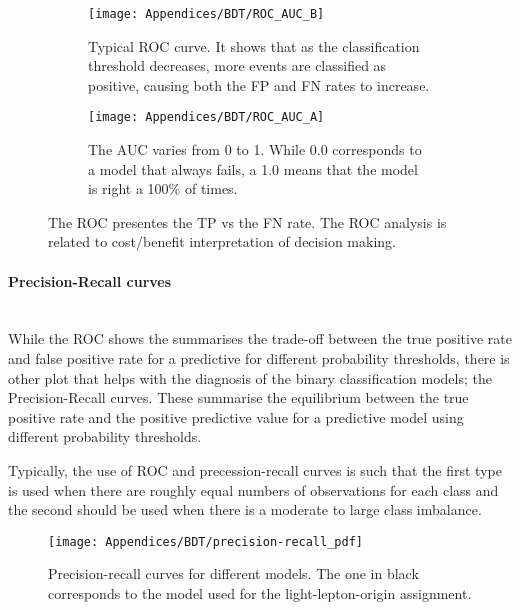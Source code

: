 \begin{figure}
\begin{subfigure}[h]{0.45\linewidth}
\texttt{[image: Appendices/BDT/ROC\_AUC\_B]}
\caption{Typical ROC curve. It shows that as the classification threshold decreases, more events are classified as positive, 
causing both the FP and FN rates to increase.}
\label{fig:Appendix:BDT:ROC_AUC:ROC}
\end{subfigure}
\hfill
\begin{subfigure}[h]{0.45\linewidth}
\texttt{[image: Appendices/BDT/ROC\_AUC\_A]}
\caption{The AUC varies from 0 to 1. While 0.0 corresponds to a model that always fails, a 1.0 
means that the model is right a 100\% of times.}
\label{fig:Appendix:BDT:ROC_AUC:AUC}
\end{subfigure}%
\caption{The ROC presentes the TP vs the FN rate. The ROC analysis is related
to cost/benefit interpretation of decision making. }
\label{fig:Appendix:BDT:ROC_AUC}
\end{figure}


\paragraph{Precision-Recall curves}\mbox{}\\
While the ROC shows the summarises the trade-off between 
the true positive rate and false positive rate for a predictive 
for different probability thresholds, there is other plot that helps
with the diagnosis of the binary classification models; the Precision-Recall curves.
These summarise the equilibrium between the true positive rate and 
the positive predictive value for a predictive model using different probability thresholds.

Typically, the use of ROC and precession-recall curves is such that the first type is used
when there are roughly equal numbers of observations for each class and
the second should be used when there is a moderate to large class imbalance.

\begin{figure}
\centering
  \centering
  \texttt{[image: Appendices/BDT/precision-recall\_pdf]}
\caption{Precision-recall curves for different models. The one in black corresponds to the
model used for the light-lepton-origin assignment.}
\label{fig:Appendix:BDT:precision-recallCurve}
\end{figure}

